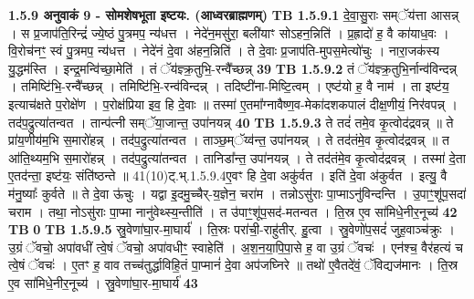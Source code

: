 \documentclass[17pt]{extarticle}
\begin{document}
                \textbf{ 1.5.9      अनुवाकं   9 - सोमशेषभूता इष्टयः. (आध्वरब्राह्मणम्)} \newline
                                \textbf{ TB 1.5.9.1} \newline
                  दे॒वा॒सु॒राः सम्ॅय॑त्ता आसन्न् । स प्र॒जाप॑ति॒रिन्द्रं॑ ज्ये॒ष्ठं पु॒त्रमप॒ न्य॑धत्त । नेदे॑न॒मसु॑रा॒ बली॑याꣳ सोऽहन॒न्निति॑ । प्र॒ह्रादो॑ ह॒ वै का॑याध॒वः । वि॒रोच॑नꣳ॒॒ स्वं पु॒त्रमप॒ न्य॑धत्त । नेदे॑नं दे॒वा अ॑हन॒न्निति॑ । ते दे॒वाः प्र॒जाप॑ति-मुपस॒मेत्यो॑चुः । नारा॒जक॑स्य यु॒द्धम॑स्ति । इन्द्र॒मन्वि॑च्छा॒मेति॑ । तं ॅय॑ज्ञ्क्र॒तुभि॒-रन्वै᳚च्छन्न् \textbf{ 39} \newline
                  \newline
                                \textbf{ TB 1.5.9.2} \newline
                  तं ॅय॑ज्ञ्क्र॒तुभि॒र्नान्व॑विन्दन्न् । तमिष्टि॑भि॒-रन्वै᳚च्छन्न् । तमिष्टि॑भि॒-रन्व॑विन्दन्न् । तदिष्टी॑ना-मिष्टि॒त्वम् । एष्ट॑यो ह॒ वै नाम॑ । ता इष्ट॑य॒ इत्याच॑क्षते प॒रोक्षे॑ण । प॒रोक्ष॑प्रिया इव॒ हि दे॒वाः ॥ तस्मा॑ ए॒तमा᳚ग्नावैष्ण॒व-मेका॑दशकपालं दीक्ष॒णीयं॒ निर॑वपन्न् । तद॑प॒द्रुत्या॑तन्वत । तान्प॑त्नी सम्ॅया॒जान्त॒ उपा॑नयन्न् \textbf{ 40} \newline
                  \newline
                                \textbf{ TB 1.5.9.3} \newline
                  ते तदं॑ तमे॒व कृ॒त्वोद॑द्रवन्न् ॥ ते प्रा॑य॒णीय॑म॒भि स॒मारो॑हन्न् । तद॑प॒द्रुत्या॑तन्वत । ताञ्छ॒म्ॅय्व॑न्त॒ उपा॑नयन्न् । ते तद॑तंमे॒व कृ॒त्वोद॑द्रवन्न् ॥ त आ॑ति॒थ्यम॒भि स॒मारो॑हन्न् । तद॑प॒द्रुत्या॑तन्वत । तानिडा᳚न्त॒ उपा॑नयन्न् । ते तद॑तंमे॒व कृ॒त्वोद॑द्रवन्न् । तस्मा॑ दे॒ता ए॒तद॑न्ता॒ इष्ट॑यः॒ संति॑ष्ठन्ते ॥ 41(10)ट्.भ्.1.5.9.4ए॒वꣳ हि दे॒वा अकु॑र्वत । इति॑ दे॒वा अ॑कुर्वत । इत्यु॒ वै म॑नु॒ष्याः᳚ कुर्वते ॥ ते दे॒वा ऊ॑चुः । यद्वा इ॒दमु॒च्चैर्-य॒ज्ञेन॒ चरा॑म । तन्नोऽसु॑राः पा॒प्माऽनु॑विन्दन्ति । उ॒पाꣳ॒॒शू॑प॒सदा॑ चराम । तथा॒ नोऽसु॑राः पा॒प्मा नानु॑वेथ्स्य॒न्तीति॑ । त उ॑पाꣳ॒॒शू॑प॒सद॑-मतन्वत । ति॒स्र ए॒व सा॑मिधे॒नीर॒नूच्य॑ \textbf{ 42} \newline
                  \newline
                                \textbf{ TB } \newline
                   \textbf{ 0} \newline
                  \newline
                                \textbf{ TB 1.5.9.5} \newline
                  स्रु॒वेणा॑घा॒र-मा॒घार्य॑ । ति॒स्रः परा॑ची॒-राहु॑तीर्. हु॒त्वा । स्रु॒वेणो॑प॒सदं॑ जुह॒वाञ्च॑क्रुः । उ॒ग्रं ॅवचो॒ अपा॑वधीं त्वे॒षं ॅवचो॒ अपा॑वधीꣳ॒॒ स्वाहेति॑ । अ॒श॒न॒या॒पि॒पा॒से ह॒ वा उ॒ग्रं ॅवचः॑ । एन॑श्च॒ वैर॑हत्यं च त्वे॒षं ॅवचः॑ । ए॒तꣳ ह॒ वाव तच्च॑तुर्द्धाविहि॒तं पा॒प्मानं॑ दे॒वा अप॑जघ्निरे ॥ तथो॑ ए॒वैतदे॑वं॒ ॅविद्यज॑मानः । ति॒स्र ए॒व सा॑मिधे॒नीर॒नूच्य॑ । स्रु॒वेणा॑घा॒र-मा॒घार्य॑ \textbf{ 43} \newline
\end{document}
